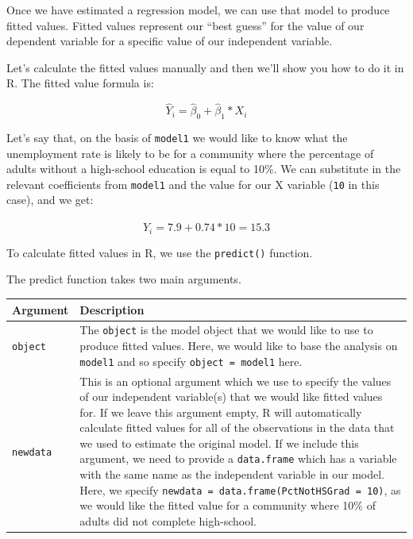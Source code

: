 \documentclass[]{article}
\begin{document}
Once we have estimated a regression model, we can use that model to produce fitted values. Fitted values represent our ``best guess'' for the value of our dependent variable for a specific value of our independent variable.

Let's calculate the fitted values manually and then we'll show you how to do it in R. The fitted value formula is:

\[\hat{Y}_{i} = \hat{\beta}_0 + \hat{\beta}_1 * X_i\]

Let's say that, on the basis of \texttt{model1} we would like to know what the unemployment rate is likely to be for a community where the percentage of adults without a high-school education is equal to 10\%. We can substitute in the relevant coefficients from \texttt{model1} and the value for our X variable (\texttt{10} in this case), and we get:

\[\hat{Y}_{i} = 7.9 + 0.74 * 10 = 15.3\]

To calculate fitted values in R, we use the \texttt{predict()} function.

The predict function takes two main arguments.

\begin{longtable}[]{@{}ll@{}}
\toprule
\begin{minipage}[b]{0.11\columnwidth}\raggedright
Argument\strut
\end{minipage} & \begin{minipage}[b]{0.83\columnwidth}\raggedright
Description\strut
\end{minipage}\tabularnewline
\midrule
\endhead
\begin{minipage}[t]{0.11\columnwidth}\raggedright
\texttt{object}\strut
\end{minipage} & \begin{minipage}[t]{0.83\columnwidth}\raggedright
The \texttt{object} is the model object that we would like to use to produce fitted values. Here, we would like to base the analysis on \texttt{model1} and so specify \texttt{object\ =\ model1} here.\strut
\end{minipage}\tabularnewline
\begin{minipage}[t]{0.11\columnwidth}\raggedright
\texttt{newdata}\strut
\end{minipage} & \begin{minipage}[t]{0.83\columnwidth}\raggedright
This is an optional argument which we use to specify the values of our independent variable(s) that we would like fitted values for. If we leave this argument empty, R will automatically calculate fitted values for all of the observations in the data that we used to estimate the original model. If we include this argument, we need to provide a \texttt{data.frame} which has a variable with the same name as the independent variable in our model. Here, we specify \texttt{newdata\ =\ data.frame(PctNotHSGrad\ =\ 10)}, as we would like the fitted value for a community where 10\% of adults did not complete high-school.\strut
\end{minipage}\tabularnewline
\bottomrule
\end{longtable}
\end{document}
